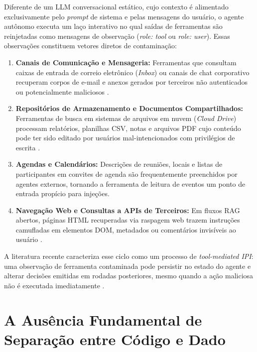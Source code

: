 Diferente de um LLM conversacional estático, cujo contexto é alimentado exclusivamente pelo \textit{prompt} de sistema e pelas mensagens do usuário, o agente autônomo executa um laço interativo no qual saídas de ferramentas são reinjetadas como mensagens de observação (\textit{role: tool} ou \textit{role: user}). Essas observações constituem vetores diretos de contaminação:

\begin{enumerate}
    \item \textbf{Canais de Comunicação e Mensageria:} Ferramentas que consultam caixas de entrada de correio eletrônico (\textit{Inbox}) ou canais de chat corporativo recuperam corpos de e-mail e anexos gerados por terceiros não autenticados ou potencialmente maliciosos \cite{dziemian2026vulnerableaiagentsindirect}.
    \item \textbf{Repositórios de Armazenamento e Documentos Compartilhados:} Ferramentas de busca em sistemas de arquivos em nuvem (\textit{Cloud Drive}) processam relatórios, planilhas CSV, notas e arquivos PDF cujo conteúdo pode ter sido editado por usuários mal-intencionados com privilégios de escrita \cite{greshake2023youvesignedforcompromising}.
    \item \textbf{Agendas e Calendários:} Descrições de reuniões, locais e listas de participantes em convites de agenda são frequentemente preenchidos por agentes externos, tornando a ferramenta de leitura de eventos um ponto de entrada propício para injeções.
    \item \textbf{Navegação Web e Consultas a APIs de Terceiros:} Em fluxos RAG abertos, páginas HTML recuperadas via raspagem web trazem instruções camufladas em elementos DOM, metadados ou comentários invisíveis ao usuário \cite{ferrag2025promptinjectionsprotocolexploits}.
\end{enumerate}

A literatura recente caracteriza esse ciclo como um processo de \textit{tool-mediated IPI}: uma observação de ferramenta contaminada pode persistir no estado do agente e alterar decisões emitidas em rodadas posteriores, mesmo quando a ação maliciosa não é executada imediatamente \cite{zhang2026agentsentrymitigatingindirectprompt}.

\section{A Ausência Fundamental de Separação entre Código e Dado}
\label{sec:von_neumann_vs_llm}

